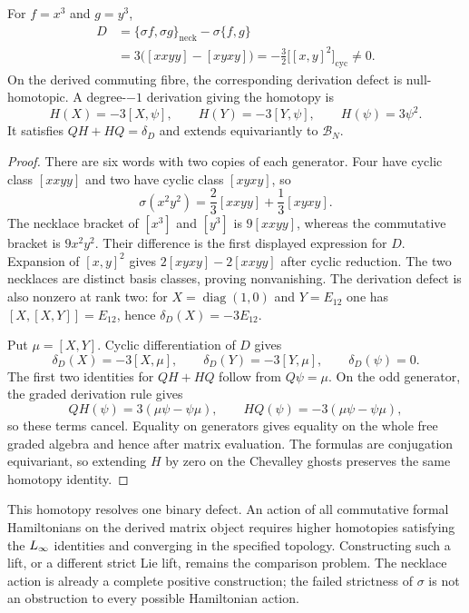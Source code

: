 \begin{proposition}
For $f=x^3$ and $g=y^3$,
\[
\begin{split}
 D&=\{\sigma f,\sigma g\}_{\mathrm{neck}}
                      -\sigma\{f,g\}\\
  &=3\bigl([xxyy]-[xyxy]\bigr)
   =-\frac32\bigl[[x,y]^2\bigr]_{\mathrm{cyc}}\ne0.
\end{split}
\]
On the derived commuting fibre, the corresponding derivation defect
is null-homotopic.  A degree-$-1$ derivation giving the homotopy is
\[
 H(X)=-3[X,\psi],\qquad
 H(Y)=-3[Y,\psi],\qquad
 H(\psi)=3\psi^2.
\]
It satisfies $QH+HQ=\delta_D$ and extends equivariantly to
$\mathcal B_N$.
\end{proposition}
\begin{proof}
There are six words with two copies of each generator.  Four have cyclic
class $[xxyy]$ and two have cyclic class $[xyxy]$, so
\[
 \sigma(x^2y^2)=\frac23[xxyy]+\frac13[xyxy].
\]
The necklace bracket of $[x^3]$ and $[y^3]$ is $9[xxyy]$,
whereas the commutative bracket is $9x^2y^2$.
Their difference is the first displayed expression for $D$.
Expansion of $[x,y]^2$ gives
$2[xyxy]-2[xxyy]$ after cyclic reduction.
The two necklaces are distinct basis classes, proving nonvanishing.
The derivation defect is also nonzero at rank two: for
$X=\operatorname{diag}(1,0)$ and $Y=E_{12}$ one has
$[X,[X,Y]]=E_{12}$, hence $\delta_D(X)=-3E_{12}$.

Put $\mu=[X,Y]$.  Cyclic differentiation of $D$ gives
\[
 \delta_D(X)=-3[X,\mu],\qquad
 \delta_D(Y)=-3[Y,\mu],\qquad \delta_D(\psi)=0.
\]
The first two identities for $QH+HQ$ follow from $Q\psi=\mu$.
On the odd generator, the graded derivation rule gives
\[
 QH(\psi)=3(\mu\psi-\psi\mu),\qquad
 HQ(\psi)=-3(\mu\psi-\psi\mu),
\]
so these terms cancel.  Equality on generators gives equality on
the whole free graded algebra and hence after matrix evaluation.
The formulas are conjugation equivariant, so extending $H$ by zero
on the Chevalley ghosts preserves the same homotopy identity.
\end{proof}

This homotopy resolves one binary defect.  An action of all
commutative formal Hamiltonians on the derived matrix object requires
higher homotopies satisfying the $L_\infty$ identities and converging
in the specified topology.  Constructing such a lift, or a different
strict Lie lift, remains the comparison problem.
The necklace action is already a complete positive construction;
the failed strictness of $\sigma$ is not an obstruction to every
possible Hamiltonian action.

